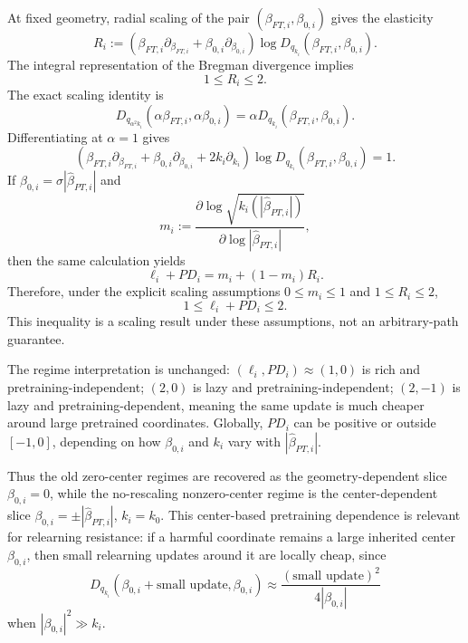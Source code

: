 \documentclass[11pt]{article}
\begin{document}
At fixed geometry, radial scaling of the pair \((\beta_{FT,i},\beta_{0,i})\) gives the elasticity
\begin{equation}
    R_i
    :=
    \left(
    \beta_{FT,i}\partial_{\beta_{FT,i}}
    +
    \beta_{0,i}\partial_{\beta_{0,i}}
    \right)
    \log D_{q_{k_i}}(\beta_{FT,i},\beta_{0,i}).
\end{equation}
The integral representation of the Bregman divergence implies
\begin{equation}
    1\le R_i\le2.
\end{equation}
The exact scaling identity is
\begin{equation}
    D_{q_{\alpha^2k_i}}(\alpha\beta_{FT,i},\alpha\beta_{0,i})
    =
    \alpha D_{q_{k_i}}(\beta_{FT,i},\beta_{0,i}).
\end{equation}
Differentiating at \(\alpha=1\) gives
\begin{equation}
    \left(
    \beta_{FT,i}\partial_{\beta_{FT,i}}
    +
    \beta_{0,i}\partial_{\beta_{0,i}}
    +
    2k_i\partial_{k_i}
    \right)
    \log D_{q_{k_i}}(\beta_{FT,i},\beta_{0,i})
    =
    1.
\end{equation}
If \(\beta_{0,i}=\sigma|\widehat\beta_{PT,i}|\) and
\begin{equation}
    m_i
    :=
    \frac{\partial\log\sqrt{k_i(|\widehat\beta_{PT,i}|)}}{\partial\log |\widehat\beta_{PT,i}|},
\end{equation}
then the same calculation yields
\begin{equation}
    \ell_i+PD_i
    =
    m_i+(1-m_i)R_i.
\end{equation}
Therefore, under the explicit scaling assumptions \(0\le m_i\le1\) and \(1\le R_i\le2\),
\begin{equation}
    \boxed{1\le\ell_i+PD_i\le2.}
\end{equation}
This inequality is a scaling result under these assumptions, not an arbitrary-path guarantee.

The regime interpretation is unchanged: \((\ell_i,PD_i)\approx(1,0)\) is rich and pretraining-independent; \((2,0)\) is lazy and pretraining-independent; \((2,-1)\) is lazy and pretraining-dependent, meaning the same update is much cheaper around large pretrained coordinates. Globally, \(PD_i\) can be positive or outside \([-1,0]\), depending on how \(\beta_{0,i}\) and \(k_i\) vary with \(|\widehat\beta_{PT,i}|\).

Thus the old zero-center regimes are recovered as the geometry-dependent slice \(\beta_{0,i}=0\), while the no-rescaling nonzero-center regime is the center-dependent slice \(\beta_{0,i}=\pm|\widehat\beta_{PT,i}|\), \(k_i=k_0\). This center-based pretraining dependence is relevant for relearning resistance: if a harmful coordinate remains a large inherited center \(\beta_{0,i}\), then small relearning updates around it are locally cheap, since
\begin{equation}
    D_{q_{k_i}}(\beta_{0,i}+\text{small update},\beta_{0,i})
    \approx
    \frac{(\text{small update})^2}{4|\beta_{0,i}|}
\end{equation}
when \(|\beta_{0,i}|^2\gg k_i\).
\end{document}
